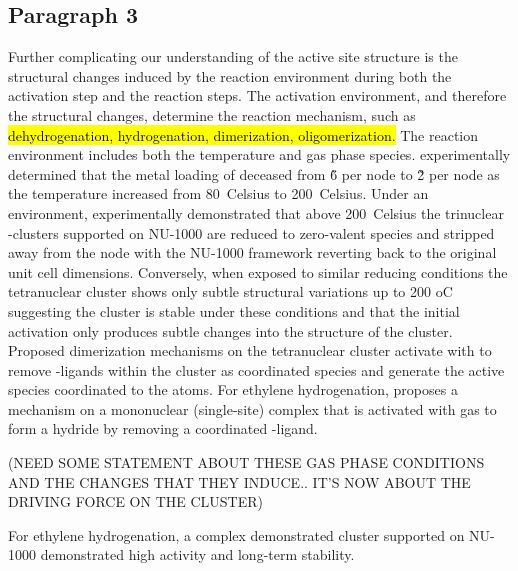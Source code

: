 \documentclass[journal=jctcce,manuscript=article]{achemso}
\begin{document}
\subsection{Paragraph 3}
Further complicating our understanding of the active site structure is the structural changes induced  by the reaction environment during both the activation step and the reaction steps. The activation environment, and therefore the structural changes, determine the reaction mechanism, such as \hl{dehydrogenation, hydrogenation, dimerization, oligomerization.} The reaction environment includes both the temperature and gas phase species. \citeauthor{Kim2015} experimentally determined that the metal loading of  deceased from \~6  per node to \~2  per node as the temperature increased from \SI{80}{Celsius} to \SI{200}{Celsius}.\cite{Kim2015} Under an  environment, \citeauthor{Halder2020} experimentally demonstrated that above \SI{200}{Celsius} the trinuclear -clusters supported on NU-1000 are reduced to zero-valent  species and stripped away from the node with the NU-1000 framework reverting back to the original unit cell dimensions.\cite{Halder2020} Conversely, when exposed to similar reducing conditions the tetranuclear  cluster shows only subtle structural variations up to 200 oC\cite{PlateroPrats2017} suggesting the cluster is stable under these conditions and that the initial activation only produces subtle changes into the structure of the cluster. Proposed dimerization mechanisms on the tetranuclear  cluster activate with  to remove -ligands within the cluster as coordinated  species and generate the active  species coordinated to the  atoms.\cite{Ye2017} For ethylene hydrogenation, \citeauthor{Li2016sintering} proposes a mechanism on a mononuclear (single-site)  complex that is activated with  gas to form a  hydride by removing a coordinated -ligand.\cite{Li2016sintering}


(NEED SOME STATEMENT ABOUT THESE GAS PHASE CONDITIONS AND THE CHANGES THAT THEY INDUCE.. IT'S NOW ABOUT THE DRIVING FORCE ON THE CLUSTER)


For ethylene hydrogenation, a  complex demonstrated  cluster supported on NU-1000 demonstrated high activity and long-term stability.\cite{Li2016sintering} 


\end{document}
